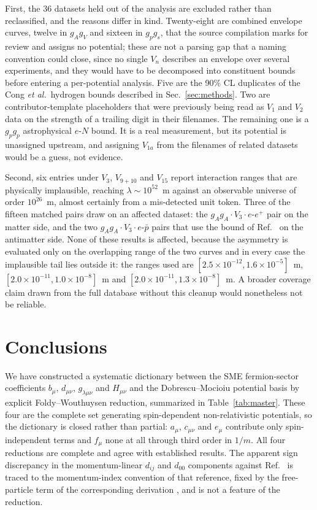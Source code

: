 \documentclass[
  aps,
  prd,
  reprint,
  amsmath,
  amssymb,
  nofootinbib,
  superscriptaddress,
  floatfix
]{revtex4-2}
\begin{document}
First, the 36 datasets held out of the analysis are excluded rather than
reclassified, and the reasons differ in kind. Twenty-eight are combined envelope curves, twelve in $g_Ag_V$ and
sixteen in $g_pg_s$, that the source compilation marks for review and
assigns no potential; these are not a parsing gap that a naming convention could
close, since no single $V_n$ describes an envelope over several
experiments, and they would have to be decomposed into constituent bounds
before entering a per-potential analysis. Five are the 90\% CL duplicates of the Cong \textit{et al.}\ hydrogen
bounds described in Sec.~\ref{sec:methods}. Two are contributor-template
placeholders that were previously being read as $V_1$ and $V_2$ data on
the strength of a trailing digit in their filenames. The remaining one is
a $g_pg_p$ astrophysical $e$-$N$ bound. It is a real measurement, but its
potential is unassigned upstream, and assigning $V_{1a}$ from the filenames
of related datasets would be a guess, not evidence.

Second, six entries under $V_3$, $V_{9+10}$ and $V_{15}$ report
interaction ranges that are physically implausible, reaching
$\lambda\sim10^{52}$~m against an observable universe of order
$10^{26}$~m, almost certainly from a mis-detected unit token. Three of
the fifteen matched pairs draw on an affected dataset: the $g_Ag_A\cdot
V_3\cdot e$-$e^+$ pair on the matter side, and the two $g_Ag_A\cdot
V_3\cdot e$-$\bar p$ pairs that use the bound of Ref.~\cite{Ficek2018} on
the antimatter side. None of these results is affected, because the
asymmetry is evaluated only on the overlapping range of the two curves and
in every case the implausible tail lies outside it: the ranges used are
$[2.5\times10^{-12},1.6\times10^{-5}]$~m,
$[2.0\times10^{-11},1.0\times10^{-8}]$~m and
$[2.0\times10^{-11},1.3\times10^{-8}]$~m. A broader coverage
claim drawn from the full database without this cleanup would nonetheless
not be reliable.

\section{Conclusions}
\label{sec:conclusions}

We have constructed a systematic dictionary between the SME fermion-sector
coefficients $b_\mu$, $d_{\mu\nu}$, $g_{\lambda\mu\nu}$ and $H_{\mu\nu}$
and the Dobrescu--Mocioiu potential basis by explicit Foldy--Wouthuysen
reduction, summarized in Table~\ref{tab:master}. These four are the
complete set generating spin-dependent non-relativistic potentials, so the
dictionary is closed rather than partial: $a_\mu$, $c_{\mu\nu}$ and $e_\mu$
contribute only spin-independent terms and $f_\mu$ none at all through
third order in $1/m$. All four reductions are complete
and agree with established results. The apparent sign discrepancy in the
momentum-linear $d_{ij}$ and $d_{00}$ components against
Ref.~\cite{KosteleckyLane1999} is traced to the momentum-index convention
of that reference, fixed by the free-particle term of the corresponding
derivation \cite{KosteleckyLane1999b}, and is not a feature of the
reduction.
\end{document}
